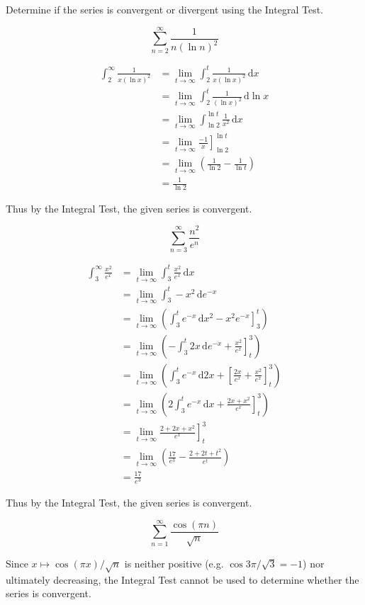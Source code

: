 \documentclass[a4paper,12pt]{article}
\newcommand{\ud}{\,\mathrm{d}}
\begin{document}
\noindent Determine if the series is convergent or divergent using
the Integral Test.

\[\sum_{n=2}^\infty \frac{1}{n(\ln n)^2}\tag{22}\]

\begin{align*}
  \int_2^\infty\frac{1}{x(\ln x)^2}
&= \lim_{t\to\infty}\int_2^t\frac{1}{x(\ln x)^2}\ud x\\
&= \lim_{t\to\infty}\int_2^t\frac{1}{(\ln x)^2}\ud\ln x\\
&= \lim_{t\to\infty}\int_{\ln 2}^{\ln t}\frac{1}{x^2}\ud x\\
&= \lim_{t\to\infty}\left.\frac{-1}{x}\right]_{\ln 2}^{\ln t}\\
&= \lim_{t\to\infty}\left(\frac{1}{\ln{2}} - \frac{1}{\ln t}\right)\\
&= \frac{1}{\ln 2}
\end{align*}

Thus by the Integral Test, the given series is convergent.

\[\sum_{n=3}^\infty\frac{n^2}{e^n}\tag{24}\]

\begin{align*}
  \int_3^\infty\frac{x^2}{e^x}
&= \lim_{t\to\infty}\int_3^t\frac{x^2}{e^x}\ud x\\
&= \lim_{t\to\infty}\int_3^t -x^2 \ud e^{-x}\\
&= \lim_{t\to\infty}\left(\int_3^t e^{-x}\ud x^2
 - \left.x^2 e^{-x}\right]_3^t\right)\\
&= \lim_{t\to\infty}\left(-\int_3^t 2x\ud e^{-x}
 + \left.\frac{x^2}{e^x}\right]_t^3\right)\\
&= \lim_{t\to\infty}\left(\int_3^t e^{-x}\ud 2x
 + \left[\frac{2x}{e^x} + \frac{x^2}{e^x}\right]_t^3\right)\\
&= \lim_{t\to\infty}\left(2\int_3^t e^{-x}\ud x
 + \left.\frac{2x + x^2}{e^x}\right]_t^3\right)\\
&= \lim_{t\to\infty}\left.\frac{2 + 2x + x^2}{e^x}\right]_t^3\\
&= \lim_{t\to\infty}\left(\frac{17}{e^3} - \frac{2 + 2t + t^2}{e^t}\right)\\
&= \frac{17}{e^3}
\end{align*}

Thus by the Integral Test, the given series is convergent.\pagebreak

\[\sum_{n=1}^\infty\frac{\cos(\pi n)}{\sqrt n}\tag{27}\]

Since $x \mapsto \cos(\pi x)/\sqrt n$ is neither positive
(e.g. $\cos 3\pi/\sqrt 3 = -1$) nor ultimately decreasing, the Integral Test
cannot be used to determine whether the series is convergent.
\end{document}
